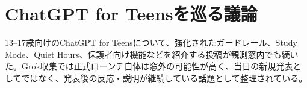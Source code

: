 \section{ChatGPT for Teensを巡る議論}
13--17歳向けのChatGPT for Teensについて、強化されたガードレール、Study Mode、Quiet Hours、保護者向け機能などを紹介する投稿が観測窓内でも続いた。Grok収集では正式ローンチ自体は窓外の可能性が高く、当日の新規発表としてではなく、発表後の反応・説明が継続している話題として整理されている。

